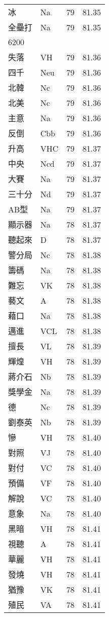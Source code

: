 \documentclass[twocolumn]{book}
\begin{document}
\begin{supertabular}{llrr}
冰 & Na & 79 &  81.35\\
全壘打 & Na & 79 &  81.35\\
6200\\
失落 & VH & 79 &  81.36\\
四千 & Neu & 79 &  81.36\\
北韓 & Nc & 79 &  81.36\\
北美 & Nc & 79 &  81.36\\
主意 & Na & 79 &  81.36\\
反倒 & Cbb & 79 &  81.36\\
升高 & VHC & 79 &  81.37\\
中央 & Ncd & 79 &  81.37\\
大賽 & Na & 79 &  81.37\\
三十分 & Nd & 79 &  81.37\\
AB型 & Na & 79 &  81.37\\
顯示器 & Na & 78 &  81.37\\
聽起來 & D & 78 &  81.37\\
警分局 & Nc & 78 &  81.38\\
籌碼 & Na & 78 &  81.38\\
難忘 & VK & 78 &  81.38\\
藝文 & A & 78 &  81.38\\
藉口 & Na & 78 &  81.38\\
邁進 & VCL & 78 &  81.38\\
擅長 & VL & 78 &  81.39\\
輝煌 & VH & 78 &  81.39\\
蔣介石 & Nb & 78 &  81.39\\
獎學金 & Na & 78 &  81.39\\
德 & Nc & 78 &  81.39\\
劉泰英 & Nb & 78 &  81.39\\
慘 & VH & 78 &  81.40\\
對照 & VJ & 78 &  81.40\\
對付 & VC & 78 &  81.40\\
預備 & VF & 78 &  81.40\\
解說 & VC & 78 &  81.40\\
意象 & Na & 78 &  81.40\\
黑暗 & VH & 78 &  81.41\\
視聽 & A & 78 &  81.41\\
華麗 & VH & 78 &  81.41\\
發燒 & VH & 78 &  81.41\\
猶豫 & VK & 78 &  81.41\\
殖民 & VA & 78 &  81.41\\

\end{supertabular}
\end{document}
